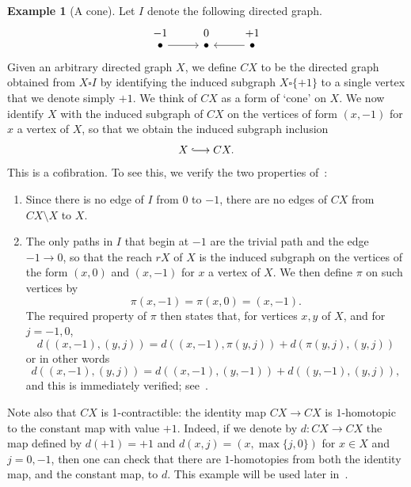 \documentclass[a4paper, 11 pt, oneside, reqno]{amsart}
\numberwithin{lemma}{section}
\theoremstyle{definition}
\newtheorem{example}[lemma]{Example}
\begin{document}
\begin{example}[A cone]\label{cone-cofibration}
    Let \(I\) denote the following directed graph.
    \[
    \begin{tikzcd}
        -1 & 0 & +1 \\ [-20]
        \bullet\arrow{r} & \bullet & \bullet \arrow{l}
    \end{tikzcd}
    \]
    Given an arbitrary directed graph $X$, we define $CX$ to be the
    directed graph obtained from $X\square I$ by identifying the 
    induced subgraph $X\square\{+1\}$ to a single vertex
    that we denote simply $+1$.
    We think of $CX$ as a form of `cone' on $X$.
    We now identify $X$ with the induced subgraph of $CX$ on the
    vertices of form $(x,-1)$ for $x$ a vertex of $X$,
    so that we obtain the induced subgraph inclusion
    \[
        X\lhook\joinrel\longrightarrow CX.
    \]
    This is a cofibration.
    To see this, we verify the two properties of~:
    \begin{enumerate}
        \item
        Since there is no edge of $I$ from $0$ to $-1$, 
        there are no edges of $CX$ from $CX\setminus X$ to $X$.
        \item
        The only paths in $I$ that begin at $-1$ are the trivial path
        and the edge $-1\to 0$,
        so that the reach $rX$ of $X$ is the induced subgraph on
        the vertices of the form $(x,0)$ and $(x,-1)$
        for $x$ a vertex of $X$.
        We then define $\pi$ on such vertices by
        \[
            \pi(x,-1) = \pi(x,0) = (x,-1).
        \]
        The required property of $\pi$ then states that,
        for vertices $x,y$ of $X$, and for $j=-1,0$,
        \[
            d((x,-1),(y,j))=d((x,-1),\pi(y,j))+d(\pi(y,j),(y,j))
        \]
        or in other words
        \[
            d((x,-1),(y,j))=d((x,-1),(y,-1))+d((y,-1),(y,j)),
        \]
        and this is immediately verified; see~.
    \end{enumerate}
    Note also that $CX$ is 1-contractible: the 
    identity map $CX\to CX$ is $1$-homotopic to the constant map
    with value $+1$.
    Indeed, if we denote by $d\colon CX\to CX$ the map defined
    by $d(+1)=+1$ and $d(x,j) = (x,\max\{j,0\})$ 
    for $x\in X$ and $j=0,-1$, 
    then one can check that there are $1$-homotopies 
    from both the identity map, and the constant map, to $d$.
    This example will be used later in~.
\end{example}
\end{document}
